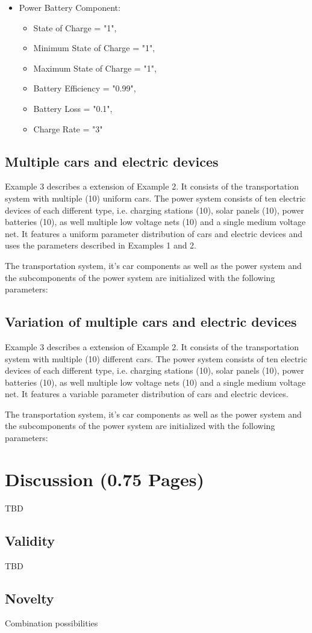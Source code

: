 \begin{itemize}
	\item Power Battery Component:
	\begin{itemize}
		\item State of Charge = "1",
		\item Minimum State of Charge = "1",
		\item Maximum State of Charge = "1", 
		\item Battery Efficiency = "0.99",
		\item Battery Loss = "0.1",
		\item Charge Rate = "3"
	\end{itemize}	
			
\end{itemize}


\subsection{Multiple cars and electric devices}
Example 3 describes a extension of Example 2. It consists of the transportation system with multiple (10) uniform cars.
The power system consists of ten electric devices of each different type, i.e. charging stations (10), solar panels (10), power batteries (10), as well multiple low voltage nets (10) and a single medium voltage net.
It features a uniform parameter distribution of cars and electric devices and uses the parameters described in Examples 1 and 2.

The transportation system, it's car components as well as the power system and the subcomponents of the power system are initialized with the following parameters:

\subsection{Variation of multiple cars and electric devices}
Example 3 describes a extension of Example 2. It consists of the transportation system with multiple (10) different cars.
The power system consists of ten electric devices of each different type, i.e. charging stations (10), solar panels (10), power batteries (10), as well multiple low voltage nets (10) and a single medium voltage net.
It features a variable parameter distribution of cars and electric devices.

The transportation system, it's car components as well as the power system and the subcomponents of the power system are initialized with the following parameters:

\section{Discussion (0.75 Pages)}
\label{section:discussion}

TBD

\subsection{Validity}

TBD

\subsection{Novelty}

Combination possibilities